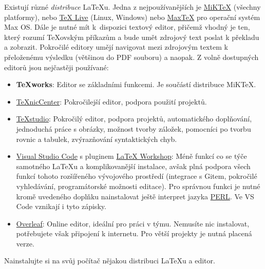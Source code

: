 \documentclass[a4paper,11pt,twoside]{article}
\theoremstyle{red}
\theoremstyle{green}
\begin{document}
    Existují různé \emph{distribuce} \LaTeX{}u.
    Jedna z nejpoužívanějších je \href{https://miktex.org/}{MiKTeX} (všechny platformy), nebo \href{https://www.tug.org/texlive/}{TeX Live} (Linux, Windows) nebo \href{https://www.tug.org/mactex/}{MaxTeX} pro operační systém Max OS.
    Dále je nutné mít k~dispozici textový editor, přičemž vhodný je ten, který rozumí \TeX{}ovským příkazům a bude umět zdrojový text poslat k překladu a zobrazit.
    Pokročilé editory umějí navigovat mezi zdrojovým textem k přeloženému výsledku (většinou do PDF souboru) a naopak.
    Z volně dostupných editorů jsou nejčastěji používané:
    \begin{itemize}
        \item {\bf TeXworks}: 
            Editor se základními funkcemi. Je součástí distribuce MiKTeX.
        \item \href{https://www.texniccenter.org/}{TeXnicCenter}: 
            Pokročilejší editor, podpora použití projektů.
        \item \href{https://www.texstudio.org/}{TeXstudio}: 
            Pokročilý editor, podpora projektů, automatického doplňování, jednoduchá práce s obrázky, možnost tvorby záložek, pomocníci po tvorbu rovnic a tabulek, zvýrazňování syntaktických chyb.
        \item \href{https://code.visualstudio.com/}{Visual Studio Code} s pluginem \href{https://marketplace.visualstudio.com/items?itemName=James-Yu.latex-workshop}{LaTeX Workshop}: 
            Méně funkcí co se týče samotného \LaTeX{}u a komplikovanější instalace, avšak plná podpora všech funkcí tohoto rozšířeného vývojového prostředí (integrace s Gitem, pokročilé vyhledávání, programátorské možnosti editace).
            Pro správnou funkci je nutné kromě uvedeného doplňku nainstalovat ještě interpret jazyka \href{https://www.perl.org/}{PERL}.
            Ve VS Code vznikají i tyto zápisky.
        \item \href{https://www.overleaf.com/}{Overleaf}: Online editor, ideální pro práci v týmu. 
            Nemusíte nic instalovat, potřebujete však připojení k internetu. 
            Pro větší projekty je nutná placená verze.
    \end{itemize}

    \begin{task}
        Nainstalujte si na svůj počítač nějakou distribuci \LaTeX{}u a editor.
    \end{task}
\end{document}
